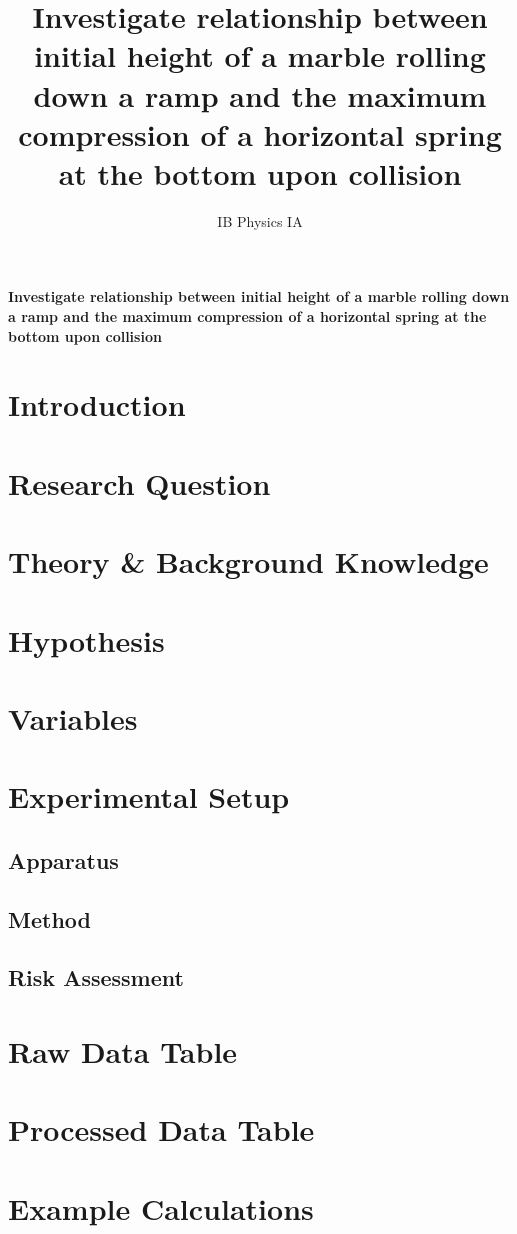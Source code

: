 \documentclass[11pt]{article}
\title{Investigate relationship between initial height of a marble rolling down
a ramp and the maximum compression of a horizontal spring at the bottom
upon collision}
\date{IB Physics IA}
\begin{document}
    \textbf {Investigate relationship between initial height of a marble rolling down a ramp and the maximum compression of a horizontal spring at the bottom upon collision}
    \section{Introduction}
    
    \section{Research Question}    
    
    \section{Theory \& Background Knowledge}
    
    \section{Hypothesis}
    
    \section{Variables}
    
    \section{Experimental Setup}
    
        \subsection{Apparatus}
        
        \subsection{Method}
        
        \subsection{Risk Assessment}
        
    \section{Raw Data Table}
    
    \section{Processed Data Table}
    
    \section{Example Calculations}
    
\end{document}
